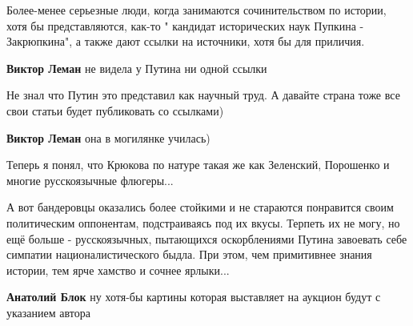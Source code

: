 \begin{itemize}
Более-менее серьезные люди, когда занимаются сочинительством по истории, хотя
бы представляются, как-то " кандидат исторических наук Пупкина - Закрюпкина", а
также дают ссылки на источники, хотя бы для приличия.

\begin{itemize}

 
\textbf{Виктор Леман} не видела у Путина ни одной ссылки

 
Не знал что Путин это представил как научный труд.
А давайте страна тоже все свои статьи будет публиковать со ссылками)

 
\textbf{Виктор Леман} она в могилянке училась)

 

Теперь я понял, что Крюкова по натуре такая же как Зеленский, Порошенко и многие русскоязычные флюгеры...

А вот бандеровцы оказались более стойкими и не стараются понравится своим
политическим оппонентам, подстраиваясь под их вкусы. Терпеть их не могу, но ещё
больше - русскоязычных, пытающихся оскорблениями Путина завоевать себе симпатии
националистического быдла. При этом, чем примитивнее знания истории, тем ярче
хамство и сочнее ярлыки...

 
\textbf{Анатолий Блок} ну хотя-бы картины которая выставляет на аукцион будут с указанием автора \Smiley[1.0][yellow]


\end{itemize}
\end{itemize}
